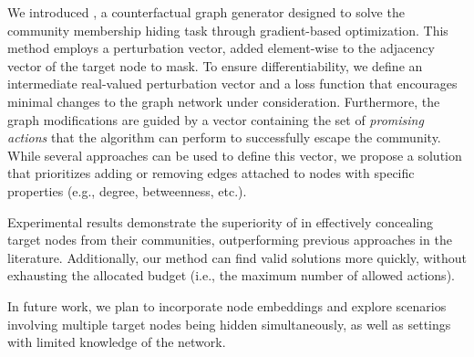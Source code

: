 We introduced \method{}, a counterfactual graph generator designed to solve the community membership hiding task through gradient-based optimization. This method employs a perturbation vector, added element-wise to the adjacency vector of the target node to mask. 
To ensure differentiability, we define an intermediate real-valued perturbation vector and a loss function that encourages minimal changes to the graph network under consideration.
Furthermore, the graph modifications are guided by a vector containing the set of \textit{promising actions} that the algorithm can perform to successfully escape the community. While several approaches can be used to define this vector, we propose a solution that prioritizes adding or removing edges attached to nodes with specific properties (e.g., degree, betweenness, etc.).

Experimental results demonstrate the superiority of \method{} in effectively concealing target nodes from their communities, outperforming previous approaches in the literature. Additionally, our method can find valid solutions more quickly, without exhausting the allocated budget (i.e., the maximum number of allowed actions).

In future work, we plan to incorporate node embeddings and explore scenarios involving multiple target nodes being hidden simultaneously, as well as settings with limited knowledge of the network.
